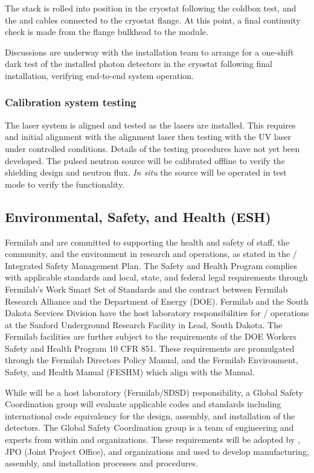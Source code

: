 The  stack is rolled into position in the cryostat following the coldbox test, and the  and  cables connected to the cryostat flange.  At this point, a final continuity check is made from the flange bulkhead to the  module.

Discussions are underway with the installation team to arrange for a one-shift dark test of the installed photon detectors in the cryostat following final installation, verifying end-to-end system operation.

\subsubsection{Calibration system testing}
The laser system is aligned and tested as the lasers are installed. This requires and initial alignment with the alignment laser then testing with the UV laser under controlled conditions. Details of the testing procedures have not yet been developed. The pulsed neutron source will be calibrated offline to verify the shielding design and neutron flux. {\it In situ} the source will be operated in test mode to verify the functionality. 

\subsection{Environmental, Safety, and Health (ESH)}
\label{sec:fdsp-tc-inst-safety}

Fermilab and  are committed to supporting the health and safety of staff, the community, and the environment in research and operations, as stated in the / Integrated Safety Management Plan. The Safety and Health Program complies with applicable standards and local, state, and federal legal requirements through Fermilab's Work Smart Set of Standards and the contract between Fermilab Research Alliance and the Department of Energy (DOE). Fermilab and the South Dakota Services Division have the host laboratory responsibilities for / operations at the Sanford Underground Research Facility in Lead, South Dakota.
The Fermilab facilities are further subject to the requirements of the DOE Workers Safety and Health Program 10 CFR 851. These requirements are promulgated through the Fermilab Directors Policy Manual, and the Fermilab Environment, Safety, and Health Manual (FESHM) which align with the   Manual.

While  will be  a host laboratory (Fermilab/SDSD) responsibility, a  Global Safety Coordination group will evaluate applicable codes and standards including international code equivalency for the design, assembly, and installation of the  detectors. The Global Safety Coordination group is  a team of engineering and  experts from within  and  organizations.  These requirements will be adopted by , JPO (Joint Project Office), and  organizations and used to develop manufacturing, assembly, and installation processes and procedures. 

